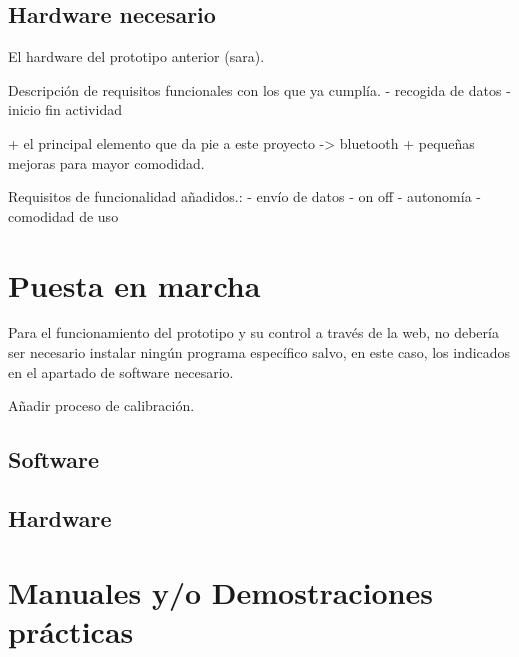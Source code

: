 \subsection{Hardware necesario}
El hardware del prototipo anterior (sara).

Descripción de requisitos funcionales con los que ya cumplía.
    - recogida de datos
    - inicio fin actividad
    

+ el principal elemento que da pie a este proyecto -> bluetooth
+ pequeñas mejoras para mayor comodidad.

Requisitos de funcionalidad añadidos.:
    - envío de datos
    - on off
    - autonomía
    - comodidad de uso


\section{Puesta en marcha}
Para el funcionamiento del prototipo y su control a través de la web, no debería ser necesario instalar ningún programa específico salvo, en este caso, los indicados en el apartado de software necesario.

Añadir proceso de calibración.

\subsection{Software}
\subsection{Hardware}



\section{Manuales y/o Demostraciones prácticas}




    
     